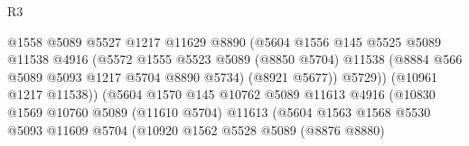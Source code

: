 \begin{lexlean}{R3}
\begin{coremodule}
                                              @1558
                                              @5089
                                              @5527
                                              @1217
                                              @11629
                                              @8890
                                              (@5604
                                                @1556
                                                @145
                                                @5525
                                                @5089
                                                @11538
                                                @4916
                                                (@5572
                                                  @1555
                                                  @5523
                                                  @5089
                                                  (@8850 @5704)
                                                  @11538
                                                  (@8884 @566 @5089 @5093 @1217 @5704 @8890 @5734)
                                                  (@8921 @5677))
                                                @5729))
                                            (@10961 @1217 @11538))
                                          (@5604
                                            @1570
                                            @145
                                            @10762
                                            @5089
                                            @11613
                                            @4916
                                            (@10830
                                              @1569
                                              @10760
                                              @5089
                                              (@11610 @5704)
                                              @11613
                                              (@5604
                                                @1563
                                                @1568
                                                @5530
                                                @5093
                                                @11609
                                                @5704
                                                (@10920
                                                  @1562
                                                  @5528
                                                  @5089
                                                  (@8876 @8880)

\end{coremodule}
\end{lexlean}
